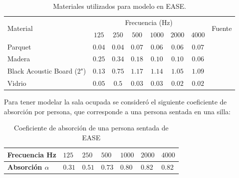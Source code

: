 \begin{table}[H]
    \centering
    \caption{Materiales utilizados para modelo en EASE.}
    \label{tab:materiales-ease}
    \begin{tabular}{|l|cccccc|c|}
    \hline
    \multirow{2}{*}{Material} & \multicolumn{6}{c|}{Frecuencia (Hz)}                                                                          & \multirow{2}{*}{Fuente} \\ \cline{2-7} 
            & \multicolumn{1}{c|}{$125$} & \multicolumn{1}{c|}{$250$} & \multicolumn{1}{c|}{$500$} & \multicolumn{1}{c|}{$1000$} & \multicolumn{1}{c|}{$2000$} & $4000$ & \\ \hline
    Parquet & \multicolumn{1}{c|}{$0.04$} & \multicolumn{1}{c|}{$0.04$} & \multicolumn{1}{c|}{$0.07$} & \multicolumn{1}{c|}{$0.06$} & \multicolumn{1}{c|}{$0.06$} &  $0.07$ & \cite{Recuero}\\ \hline
    Madera  & \multicolumn{1}{c|}{$0.25$} & \multicolumn{1}{c|}{$0.34$} & \multicolumn{1}{c|}{$0.18$} & \multicolumn{1}{c|}{$0.10$} & \multicolumn{1}{c|}{$0.10$} &  $0.06$ & \cite{Recuero}\\  \hline
    Black Acoustic Board (2") & \multicolumn{1}{c|}{$0.13$} & \multicolumn{1}{c|}{$0.75$} & \multicolumn{1}{c|}{$1.17$} & \multicolumn{1}{c|}{$1.14$} & \multicolumn{1}{c|}{$1.05$} & $1.09$ & \cite{blackboard}\\ \hline
    Vidrio  & \multicolumn{1}{c|}{$0.05$} & \multicolumn{1}{c|}{$0.5$} & \multicolumn{1}{c|}{$0.03$} & \multicolumn{1}{c|}{$0.03$} & \multicolumn{1}{c|}{$0.02$} & $0.02$ & \cite{Recuero}\\ \hline
    \end{tabular}
\end{table}

\noindent Para tener modelar la sala ocupada se consideró el siguiente coeficiente de absorción por persona,
que corresponde a una persona sentada en una silla:
\begin{table}[H]
    \centering
    \caption{Coeficiente de absorción de una persona sentada de EASE}
    \label{tab: coef abs persona}
    \begin{tabular}{|l|l|l|l|l|l|l|}
    \hline
    \textbf{Frecuencia Hz}      & $125$  & $250$  & $500$  & $1000$ & $2000$ & $4000$ \\ \hline
    \textbf{Absorción $\alpha$} & $0.31$ & $0.51$ & $0.73$ & $0.80$ & $0.82$ & $0.82$ \\ \hline
    \end{tabular}
\end{table}

